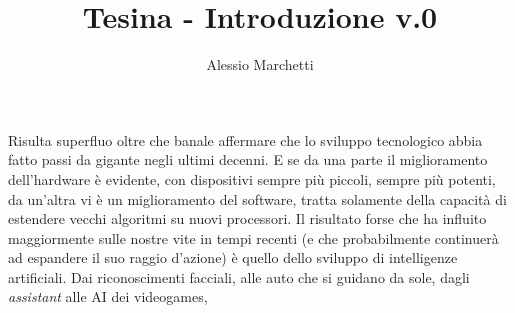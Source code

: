 \documentclass[a4paper, 11pt]{article}
\title{\myfont Tesina - Introduzione v.0}
\author{Alessio Marchetti}
\date{}
\begin{document}
\maketitle

Risulta superfluo oltre che banale affermare che lo sviluppo tecnologico abbia
fatto passi da gigante negli ultimi decenni. E se da una parte il miglioramento
dell'hardware \`e evidente, con dispositivi sempre pi\`u piccoli, sempre pi\`u
potenti, da un'altra vi \`e un miglioramento del software, tratta solamente
della capacit\`a di estendere vecchi algoritmi su nuovi processori. Il risultato
forse che ha influito maggiormente sulle nostre vite in tempi recenti (e
che probabilmente continuer\`a ad espandere il suo raggio d'azione) \`e quello
dello sviluppo di intelligenze artificiali. Dai riconoscimenti facciali, alle
auto che si guidano da sole, dagli \textit{assistant} alle AI dei videogames, 
\end{document}
